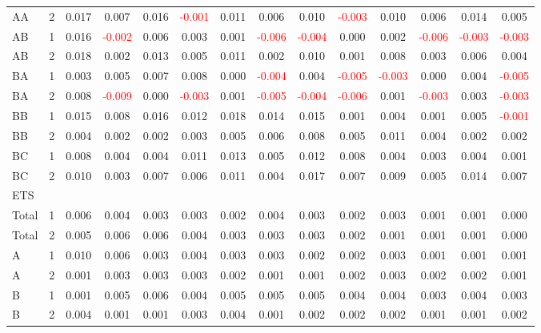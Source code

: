 \begin{table}[H]
{\begin{tabular}{llcccccccccccc}
AA & 2 & 0.017 & 0.007 & 0.016 & \textcolor{red}{-0.001} & 0.011 & 0.006 & 0.010 & \textcolor{red}{-0.003} & 0.010 & 0.006 & 0.014 & 0.005\\
AB & 1 & 0.016 & \textcolor{red}{-0.002} & 0.006 & 0.003 & 0.001 & \textcolor{red}{-0.006} & \textcolor{red}{-0.004} & 0.000 & 0.002 & \textcolor{red}{-0.006} & \textcolor{red}{-0.003} & \textcolor{red}{-0.003}\\
AB & 2 & 0.018 & 0.002 & 0.013 & 0.005 & 0.011 & 0.002 & 0.010 & 0.001 & 0.008 & 0.003 & 0.006 & 0.004\\
BA & 1 & 0.003 & 0.005 & 0.007 & 0.008 & 0.000 & \textcolor{red}{-0.004} & 0.004 & \textcolor{red}{-0.005} & \textcolor{red}{-0.003} & 0.000 & 0.004 & \textcolor{red}{-0.005}\\
BA & 2 & 0.008 & \textcolor{red}{-0.009} & 0.000 & \textcolor{red}{-0.003} & 0.001 & \textcolor{red}{-0.005} & \textcolor{red}{-0.004} & \textcolor{red}{-0.006} & 0.001 & \textcolor{red}{-0.003} & 0.003 & \textcolor{red}{-0.003}\\
BB & 1 & 0.015 & 0.008 & 0.016 & 0.012 & 0.018 & 0.014 & 0.015 & 0.001 & 0.004 & 0.001 & 0.005 & \textcolor{red}{-0.001}\\
BB & 2 & 0.004 & 0.002 & 0.002 & 0.003 & 0.005 & 0.006 & 0.008 & 0.005 & 0.011 & 0.004 & 0.002 & 0.002\\
BC & 1 & 0.008 & 0.004 & 0.004 & 0.011 & 0.013 & 0.005 & 0.012 & 0.008 & 0.004 & 0.003 & 0.004 & 0.001\\
BC & 2 & 0.010 & 0.003 & 0.007 & 0.006 & 0.011 & 0.004 & 0.017 & 0.007 & 0.009 & 0.005 & 0.014 & 0.007\\
\hline
ETS &  &  &  &  &  &  &  &  &  &  &  &  & \\
\hline
Total & 1 & 0.006 & 0.004 & 0.003 & 0.003 & 0.002 & 0.004 & 0.003 & 0.002 & 0.003 & 0.001 & 0.001 & 0.000\\
Total & 2 & 0.005 & 0.006 & 0.006 & 0.004 & 0.003 & 0.003 & 0.003 & 0.002 & 0.001 & 0.001 & 0.001 & 0.000\\
A & 1 & 0.010 & 0.006 & 0.003 & 0.004 & 0.003 & 0.003 & 0.002 & 0.002 & 0.003 & 0.001 & 0.001 & 0.001\\
A & 2 & 0.001 & 0.003 & 0.003 & 0.003 & 0.002 & 0.001 & 0.001 & 0.002 & 0.003 & 0.002 & 0.002 & 0.001\\
B & 1 & 0.001 & 0.005 & 0.006 & 0.004 & 0.005 & 0.005 & 0.005 & 0.004 & 0.004 & 0.003 & 0.004 & 0.003\\
B & 2 & 0.004 & 0.001 & 0.001 & 0.003 & 0.004 & 0.001 & 0.002 & 0.002 & 0.002 & 0.001 & 0.001 & 0.002\\

\end{tabular}}
\end{table}
